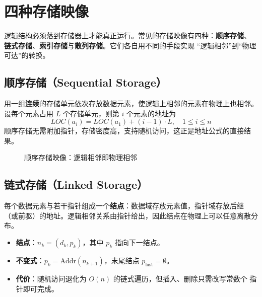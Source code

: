 \section{四种存储映像}

逻辑结构必须落到存储器上才能真正运行。常见的存储映像有四种：\textbf{顺序存储}、
\textbf{链式存储}、\textbf{索引存储}与\textbf{散列存储}。它们各自用不同的手段实现
“逻辑相邻”到“物理可达”的转换。

\subsection{顺序存储（Sequential Storage）}

用一组\textbf{连续}的存储单元依次存放数据元素，使逻辑上相邻的元素在物理上也相邻。
设每个元素占用 $L$ 个存储单元，则第 $i$ 个元素的地址为
$$LOC(a_i) = LOC(a_1) + (i-1)\cdot L, \quad 1 \le i \le n$$
顺序存储无需附加指针，存储密度高，支持随机访问，这正是地址公式的直接结果。

\begin{figure}[H]
\centering
{}
\caption{顺序存储映像：逻辑相邻即物理相邻}
\label{fig:storage_seq}
\end{figure}

\subsection{链式存储（Linked Storage）}

每个数据元素与若干指针组成一个\textbf{结点}：数据域存放元素值，指针域存放后继
（或前驱）的地址。逻辑相邻关系由指针给出，因此结点在物理上可以任意离散分布。
\begin{itemize}
    \item \textbf{结点}：$n_k = (d_k, p_k)$，其中 $p_k$ 指向下一结点。
    \item \textbf{不变式}：$p_k = \text{Addr}(n_{k+1})$，末尾结点 $p_{\text{last}} = \emptyset$。
    \item \textbf{代价}：随机访问退化为 $O(n)$ 的链式遍历，但插入、删除只需改写常数个
          指针即可完成。
\end{itemize}

